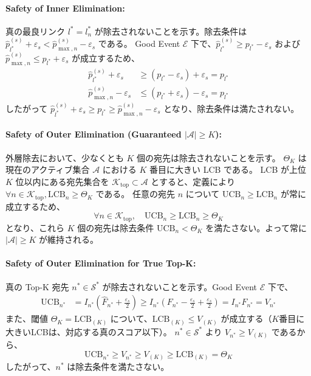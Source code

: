 \documentclass[conference]{IEEEtran}
\begin{document}
\paragraph{Safety of Inner Elimination:}
真の最良リンク $l^* = l_n^*$ が除去されないことを示す。除去条件は $\hat{p}_{l^*}^{(s)} + \varepsilon_s < \hat{p}_{\max,n}^{(s)} - \varepsilon_s$ である。
Good Event $\mathcal{E}$ 下で、$\hat{p}_{l^*}^{(s)} \ge p_{l^*} - \varepsilon_s$ および $\hat{p}_{\max,n}^{(s)} \le p_{l^*} + \varepsilon_s$ が成立するため、
\begin{align}
    \hat{p}_{l^*}^{(s)} + \varepsilon_s &\ge (p_{l^*} - \varepsilon_s) + \varepsilon_s = p_{l^*} \\
    \hat{p}_{\max,n}^{(s)} - \varepsilon_s &\le (p_{l^*} + \varepsilon_s) - \varepsilon_s = p_{l^*}
\end{align}
したがって $\hat{p}_{l^*}^{(s)} + \varepsilon_s \ge p_{l^*} \ge \hat{p}_{\max,n}^{(s)} - \varepsilon_s$ となり、除去条件は満たされない。

\paragraph{Safety of Outer Elimination (Guaranteed $|\mathcal{A}| \ge K$):}
外層除去において、少なくとも $K$ 個の宛先は除去されないことを示す。
$\Theta_K$ は現在のアクティブ集合 $\mathcal{A}$ における $K$ 番目に大きい LCB である。
LCB が上位 $K$ 位以内にある宛先集合を $\mathcal{K}_{\mathrm{top}} \subset \mathcal{A}$ とすると、定義により $\forall n \in \mathcal{K}_{\mathrm{top}}, \mathrm{LCB}_{n} \ge \Theta_K$ である。
任意の宛先 $n$ について $\mathrm{UCB}_n \ge \mathrm{LCB}_n$ が常に成立するため、
\begin{equation}
    \forall n \in \mathcal{K}_{\mathrm{top}}, \quad \mathrm{UCB}_{n} \ge \mathrm{LCB}_{n} \ge \Theta_K
\end{equation}
となり、これら $K$ 個の宛先は除去条件 $\mathrm{UCB}_n < \Theta_K$ を満たさない。よって常に $|\mathcal{A}| \ge K$ が維持される。

\paragraph{Safety of Outer Elimination for True Top-K:}
真の Top-K 宛先 $n^* \in \mathcal{S}^*$ が除去されないことを示す。Good Event $\mathcal{E}$ 下で、
\begin{align}
    \mathrm{UCB}_{n^*} &= I_{n^*} \left( \hat{F}_{n^*} + \frac{\varepsilon_s}{2} \right) \ge I_{n^*} \left( F_{n^*} - \frac{\varepsilon_s}{2} + \frac{\varepsilon_s}{2} \right) = I_{n^*} F_{n^*} = V_{n^*}
\end{align}
また、閾値 $\Theta_K = \mathrm{LCB}_{(K)}$ について、$\mathrm{LCB}_{(K)} \le V_{(K)}$ が成立する（$K$番目に大きいLCBは、対応する真のスコア以下）。
$n^* \in \mathcal{S}^*$ より $V_{n^*} \ge V_{(K)}$ であるから、
\begin{equation}
    \mathrm{UCB}_{n^*} \ge V_{n^*} \ge V_{(K)} \ge \mathrm{LCB}_{(K)} = \Theta_K
\end{equation}
したがって、$n^*$ は除去条件を満たさない。
\end{document}
